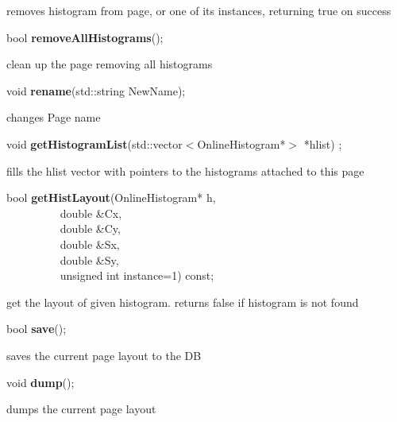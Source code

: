  removes histogram from page, or one of its instances, returning true on success


\item    bool {\bf removeAllHistograms}();


 clean up the page removing all histograms


\item    void {\bf rename}(std::string NewName);


 changes Page name 


\item    void {\bf getHistogramList}(std::vector$<$OnlineHistogram*$>$ *hlist) ;

 fills the hlist vector with pointers to the histograms attached to this page


\item    bool {\bf getHistLayout}(OnlineHistogram* h,\\\mbox{}~~~~~~~~~
		     double \&Cx,\\\mbox{}~~~~~~~~~
		     double \&Cy,\\\mbox{}~~~~~~~~~
		     double \&Sx,\\\mbox{}~~~~~~~~~
		     double \&Sy,\\\mbox{}~~~~~~~~~
		     unsigned int instance=1) const;

 get the layout of given histogram. returns false if histogram is not found


\item    bool {\bf save}();


 saves the current page layout to the DB


\item    void {\bf dump}();


 dumps the current page layout 


